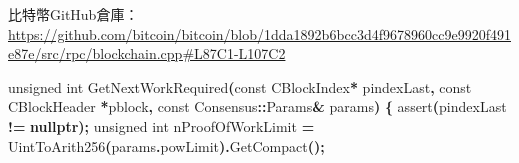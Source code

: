 \documentclass[
]{article}
\newenvironment{Shaded}{\begin{snugshade}}{\end{snugshade}}
\newcommand{\AttributeTok}[1]{\textcolor[rgb]{0.13,0.29,0.53}{#1}}
\newcommand{\DataTypeTok}[1]{\textcolor[rgb]{0.13,0.29,0.53}{#1}}
\newcommand{\KeywordTok}[1]{\textcolor[rgb]{0.13,0.29,0.53}{\textbf{#1}}}
\newcommand{\NormalTok}[1]{#1}
\newcommand{\OperatorTok}[1]{\textcolor[rgb]{0.81,0.36,0.00}{\textbf{#1}}}
\newcommand{\OtherTok}[1]{\textcolor[rgb]{0.56,0.35,0.01}{#1}}
\begin{document}
比特幣GitHub倉庫：\url{https://github.com/bitcoin/bitcoin/blob/1dda1892b6bcc3d4f9678960cc9e9920f491e87e/src/rpc/blockchain.cpp\#L87C1-L107C2}

\begin{Shaded}
\begin{Highlighting}[numbers=left,,]
\DataTypeTok{unsigned} \DataTypeTok{int}\NormalTok{ GetNextWorkRequired}\OperatorTok{(}\AttributeTok{const}\NormalTok{ CBlockIndex}\OperatorTok{*}\NormalTok{ pindexLast}\OperatorTok{,} \AttributeTok{const}\NormalTok{ CBlockHeader }\OperatorTok{*}\NormalTok{pblock}\OperatorTok{,} 
  \AttributeTok{const}\NormalTok{ Consensus}\OperatorTok{::}\NormalTok{Params}\OperatorTok{\&}\NormalTok{ params}\OperatorTok{)}
\OperatorTok{\{}
    \OtherTok{assert}\OperatorTok{(}\NormalTok{pindexLast }\OperatorTok{!=} \KeywordTok{nullptr}\OperatorTok{);}
    \DataTypeTok{unsigned} \DataTypeTok{int}\NormalTok{ nProofOfWorkLimit }\OperatorTok{=}\NormalTok{ UintToArith256}\OperatorTok{(}\NormalTok{params}\OperatorTok{.}\NormalTok{powLimit}\OperatorTok{).}\NormalTok{GetCompact}\OperatorTok{();}


\end{Highlighting}
\end{Shaded}
\end{document}
